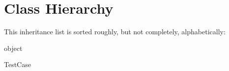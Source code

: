 \section{Class Hierarchy}
This inheritance list is sorted roughly, but not completely, alphabetically\-:\begin{DoxyCompactList}
\item object\begin{DoxyCompactList}
\item {}
\item {}
\end{DoxyCompactList}
\item Test\-Case\begin{DoxyCompactList}
\item {}
\end{DoxyCompactList}
\end{DoxyCompactList}
